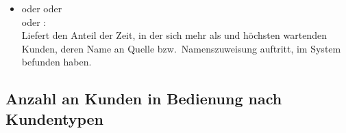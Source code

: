 \begin{itemize}
\item
{} oder  oder\\  oder :\\
Liefert den Anteil der Zeit, in der sich mehr als  und höchsten  wartenden Kunden, deren Name an Quelle bzw.\ Namenszuweisung  auftritt, im System befunden haben.

\end{itemize}



\subsection{Anzahl an Kunden in Bedienung nach Kundentypen}


